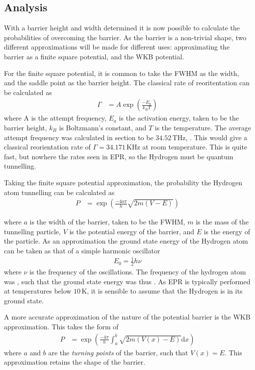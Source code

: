 \documentclass[10pt,a4paper,twocolumn,twoside]{extarticle}
\renewcommand{\d}{\text{d}}
\begin{document}
\subsection{Analysis}
With a barrier height and width determined it is now possible to calculate the probabilities of overcoming the barrier. As the barrier is a non-trivial shape, two different approximations will be made for different uses: approximating the barrier as a finite square potential, and the WKB potential. 

For the finite square potential, it is common to take the FWHM as the width, and the saddle point as the barrier height. The classical rate of reoritentation can be calculated as 
\begin{align}
    \Gamma &= A\exp({\frac{-E_a}{k_BT}})
\end{align}
where A is the attempt frequency, $E_a$ is the activation energy, taken to be the barrier height, $k_B$ is Boltzmann's constant, and $T$ is the temperature. The average attempt frequency was calculated in section to be $34.52$\,THz, . This would give a classical reorientation rate of $\Gamma = 34.171$\,KHz at room temperature. This is quite fast, but nowhere the rates seen in EPR, so the Hydrogen must be quantum tunnelling.

Taking the finite square potential approximation, the probability the Hydrogen atom tunnelling can be calculated as 
\begin{align}
    P &= \exp(\frac{-4a\pi}{h}\sqrt{2m(V-E)})
\end{align}

where $a$ is the width of the barrier, taken to be the FWHM, $m$ is the mass of the tunnelling particle, $V$ is the potential energy of the barrier, and $E$ is the energy of the particle. As an approximation the ground state energy of the Hydrogen atom can be taken as that of a simple harmonic oscillator 
\begin{align}
    E_0 = \frac{1}{2}h\nu
\end{align}
where $\nu$ is the frequency of the oscillations. The frequency of the hydrogen atom was , such that the ground state energy was thus . As EPR is typically performed at temperatures below $10$\,K, it is sensible to assume that the Hydrogen is in its ground state. 

A more accurate approximation of the nature of the potential barrier is the WKB approximation. This takes the form of 
\begin{align}
    P &= \exp(\frac{-4\pi}{h}\int_{a}^{b}\sqrt{2m(V(x)-E)}{\d}x)
\end{align}
where $a$ and $b$ are the \emph{turning points} of the barrier, such that $V(x) = E$. This approximation retains the shape of the barrier.
\end{document}

